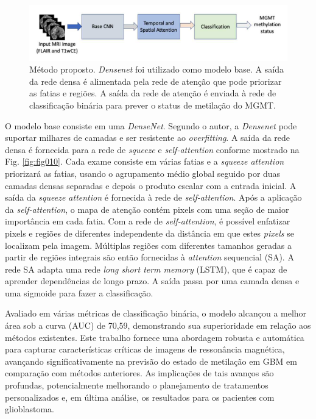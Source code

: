 \begin{figure}[htbp]
    \centering
    \includegraphics[width=1\textwidth]{figures/fig009.png}
    \caption{Método proposto. \textit{Densenet} foi utilizado como modelo base. A saída da rede densa é alimentada pela rede de atenção que pode priorizar as fatias e regiões. A saída da rede de atenção é enviada à rede de classificação binária para prever o status de metilação do MGMT.}
    \label{fig:fig009}
\end{figure}

O modelo base consiste em uma \textit{DenseNet}. Segundo o autor, a \textit{Densenet} pode suportar milhares de camadas e ser resistente ao \textit{overfitting}. A saída da rede densa é fornecida para a rede de \textit{squeeze} e \textit{self-attention} conforme mostrado na Fig. \ref{fig:fig010}. Cada exame consiste em várias fatias e a \textit{squeeze attention} priorizará as fatias, usando o agrupamento médio global seguido por duas camadas densas separadas e depois o produto escalar com a entrada inicial. A saída da \textit{squeeze attention} é fornecida à rede de \textit{self-attention}. Após a aplicação da \textit{self-attention}, o mapa de atenção contém pixels com uma seção de maior importância em cada fatia. Com a rede de \textit{self-attention}, é possível enfatizar pixels e regiões de diferentes independente da distância em que estes \textit{pixels} se localizam pela imagem. Múltiplas regiões com diferentes tamanhos geradas a partir de regiões integrais são então fornecidas à \textit{attention} sequencial (SA). A rede SA adapta uma rede \textit{long short term memory} (LSTM), que é capaz de aprender dependências de longo prazo. A saída passa por uma camada densa e uma sigmoide para fazer a classificação.

Avaliado em várias métricas de classificação binária, o modelo alcançou a melhor área sob a curva (AUC) de 70,59, demonstrando sua superioridade em relação aos métodos existentes. Este trabalho fornece uma abordagem robusta e automática para capturar características críticas de imagens de ressonância magnética, avançando significativamente na previsão do estado de metilação em GBM em comparação com métodos anteriores. As implicações de tais avanços são profundas, potencialmente melhorando o planejamento de tratamentos personalizados e, em última análise, os resultados para os pacientes com glioblastoma.

